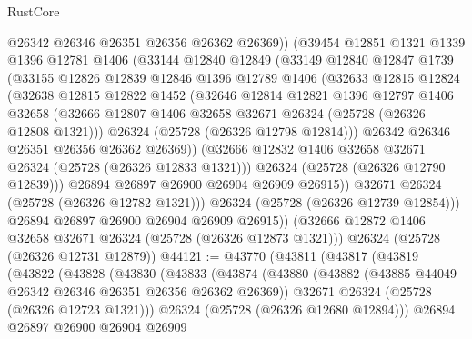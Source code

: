 \begin{lexlean}{RustCore}
\begin{coremodule}
              @26342
              @26346
              @26351
              @26356
              @26362
              @26369))
          (@39454
            @12851
            @1321
            @1339
            @1396
            @12781
            @1406
            (@33144
              @12840
              @12849
              (@33149
                @12840
                @12847
                @1739
                (@33155
                  @12826
                  @12839
                  @12846
                  @1396
                  @12789
                  @1406
                  (@32633
                    @12815
                    @12824
                    (@32638
                      @12815
                      @12822
                      @1452
                      (@32646
                        @12814
                        @12821
                        @1396
                        @12797
                        @1406
                        @32658
                        (@32666 @12807 @1406 @32658 @32671 @26324 (@25728 (@26326 @12808 @1321)))
                        @26324
                        (@25728 (@26326 @12798 @12814)))
                      @26342
                      @26346
                      @26351
                      @26356
                      @26362
                      @26369))
                  (@32666 @12832 @1406 @32658 @32671 @26324 (@25728 (@26326 @12833 @1321)))
                  @26324
                  (@25728 (@26326 @12790 @12839)))
                @26894
                @26897
                @26900
                @26904
                @26909
                @26915))
            @32671
            @26324
            (@25728 (@26326 @12782 @1321)))
          @26324
          (@25728 (@26326 @12739 @12854)))
        @26894
        @26897
        @26900
        @26904
        @26909
        @26915))
    (@32666 @12872 @1406 @32658 @32671 @26324 (@25728 (@26326 @12873 @1321)))
    @26324
    (@25728 (@26326 @12731 @12879))
@44121 := @43770
    (@43811
      (@43817
        (@43819
          (@43822
            (@43828
              (@43830
                (@43833
                  (@43874
                    (@43880
                      (@43882 (@43885 @44049 @26342 @26346 @26351 @26356 @26362 @26369))
                      @32671
                      @26324
                      (@25728 (@26326 @12723 @1321)))
                    @26324
                    (@25728 (@26326 @12680 @12894)))
                  @26894
                  @26897
                  @26900
                  @26904
                  @26909

\end{coremodule}
\end{lexlean}
